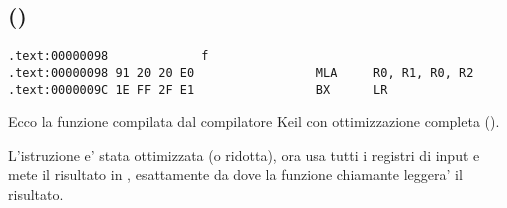 \subsection{\OptimizingKeilVI (\ARMMode)}

\begin{lstlisting}[label=ARM_leaf_example1]
.text:00000098             f
.text:00000098 91 20 20 E0                 MLA     R0, R1, R0, R2
.text:0000009C 1E FF 2F E1                 BX      LR
\end{lstlisting}


Ecco la funzione \ttf compilata dal compilatore Keil con ottimizzazione completa (\Othree).

L'istruzione \MOV e' stata ottimizzata (o ridotta), ora  usa tutti i registri di input e mete il risultato in , esattamente da dove
la funzione chiamante leggera' il risultato.
